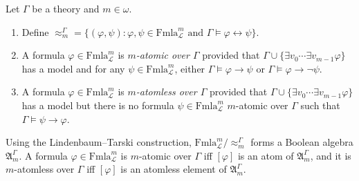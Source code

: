 Let $\Gamma$ be a theory and $m \in \omega$.

\begin{enumerate}
\item[(i)] Define $\approx_m^\Gamma = \{(\varphi, \psi) : \varphi, \psi \in \mathrm{Fmla}_{\mathcal{L}}^m \text{ and } \Gamma \models \varphi \leftrightarrow \psi\}$.

\item[(ii)] A formula $\varphi \in \mathrm{Fmla}_{\mathcal{L}}^m$ is \emph{$m$-atomic over $\Gamma$} provided that $\Gamma \cup \{\exists v_0 \cdots \exists v_{m-1} \varphi\}$ has a model and for any $\psi \in \mathrm{Fmla}_{\mathcal{L}}^m$, either $\Gamma \models \varphi \rightarrow \psi$ or $\Gamma \models \varphi \rightarrow \neg \psi$.

\item[(iii)] A formula $\varphi \in \mathrm{Fmla}_{\mathcal{L}}^m$ is \emph{$m$-atomless over $\Gamma$} provided that $\Gamma \cup \{\exists v_0 \cdots \exists v_{m-1} \varphi\}$ has a model but there is no formula $\psi \in \mathrm{Fmla}_{\mathcal{L}}^m$ $m$-atomic over $\Gamma$ such that $\Gamma \models \psi \rightarrow \varphi$.
\end{enumerate}

Using the Lindenbaum--Tarski construction, $\mathrm{Fmla}_{\mathcal{L}}^m / {\approx_m^\Gamma}$ forms a Boolean algebra $\mathfrak{A}_m^\Gamma$. A formula $\varphi \in \mathrm{Fmla}_{\mathcal{L}}^m$ is $m$-atomic over $\Gamma$ iff $[\varphi]$ is an atom of $\mathfrak{A}_m^\Gamma$, and it is $m$-atomless over $\Gamma$ iff $[\varphi]$ is an atomless element of $\mathfrak{A}_m^\Gamma$.
